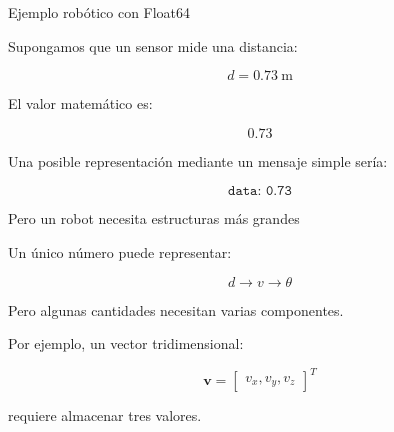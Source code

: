 \documentclass[aspectratio=169]{beamer}
\begin{document}
\begin{frame}{Ejemplo robótico con Float64}

    Supongamos que un sensor mide una distancia:

    \[
    d=0.73~\text{m}
    \]

    El valor matemático es:

    \[
    0.73
    \]

    Una posible representación mediante un mensaje simple sería:

    \[
    \boxed{
        \texttt{data: 0.73}
    }
    \]

    \vspace{0.3cm}

    \begin{center}
    \end{center}

\end{frame}

\begin{frame}{Pero un robot necesita estructuras más grandes}

    Un único número puede representar:

    \[
    d
     \rightarrow
    v
    \rightarrow
    \theta
    \]

    Pero algunas cantidades necesitan varias componentes.

    Por ejemplo, un vector tridimensional:

    \[
    \mathbf{v}
    =
    \begin{bmatrix}
        v_x,
        v_y,
        v_z
    \end{bmatrix}^T
    \]

    requiere almacenar tres valores.

    \vspace{0.3cm}


\end{frame}
\end{document}
